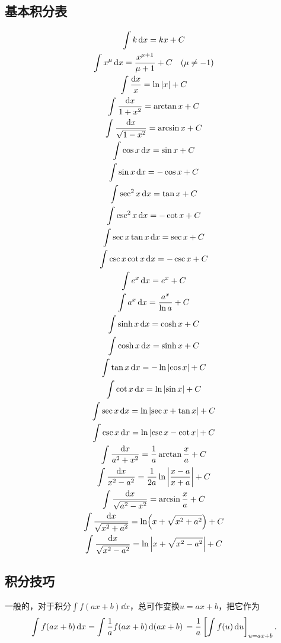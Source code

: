 \subsection{基本积分表}
\begin{gather*}
	\int k \dd{x}
	= kx + C \\
	\int x^\mu \dd{x}
	= \frac{x^{\mu + 1}}{\mu + 1} + C \quad (\mu \neq -1) \\
	\int \frac{\dd{x}}{x}
	= \ln\abs{x} + C \\
	\int \frac{\dd{x}}{1 + x^2}
	= \arctan x + C \\
	\int \frac{\dd{x}}{\sqrt{1 - x^2}}
	= \arcsin x + C \\
	\int \cos x \dd{x}
	= \sin x + C \\
	\int \sin x \dd{x}
	= -\cos x + C \\
	\int \sec^2 x \dd{x}
	= \tan x + C \\
	\int \csc^2 x \dd{x}
	= -\cot x + C \\
	\int \sec x \tan x \dd{x}
	= \sec x + C \\
	\int \csc x \cot x \dd{x}
	= -\csc x + C \\
	\int e^x \dd{x}
	= e^x + C \\
	\int a^x \dd{x}
	= \frac{a^x}{\ln a} + C \\
	\int \sinh x \dd{x}
	= \cosh x + C \\
	\int \cosh x \dd{x}
	= \sinh x + C \\
	\int \tan x \dd{x}
	= -\ln\abs{\cos x} + C \\
	\int \cot x \dd{x}
	= \ln\abs{\sin x} + C \\
	\int \sec x \dd{x}
	= \ln\abs{\sec x + \tan x} + C \\
	\int \csc x \dd{x}
	= \ln\abs{\csc x - \cot x} + C \\
	\int \frac{\dd{x}}{a^2 + x^2}
	= \frac{1}{a} \arctan\frac{x}{a} + C \\
	\int \frac{\dd{x}}{x^2 - a^2}
	= \frac{1}{2a} \ln\abs{\frac{x - a}{x + a}} + C \\
	\int \frac{\dd{x}}{\sqrt{a^2 - x^2}}
	= \arcsin\frac{x}{a} + C \\
	\int \frac{\dd{x}}{\sqrt{x^2 + a^2}}
	= \ln(x + \sqrt{x^2 + a^2}) + C \\
	\int \frac{\dd{x}}{\sqrt{x^2 - a^2}}
	= \ln\abs{x + \sqrt{x^2 - a^2}} + C
\end{gather*}

\subsection{积分技巧}
一般的，对于积分\(\int f(ax+b) \dd{x}\)，总可作变换\(u=ax+b\)，把它作为\[
	\int f(ax+b) \dd{x}
	= \int \frac{1}{a} f(ax+b) \dd{(ax+b)} \\
	= \frac{1}{a} \left[ \int f(u) \dd{u} \right]_{u=ax+b}.
\]


